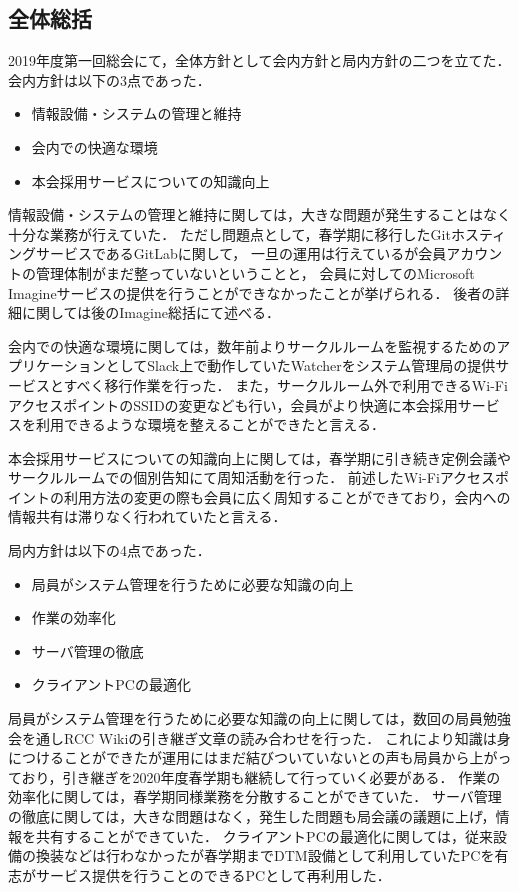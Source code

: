 \subsection*{全体総括}


2019年度第一回総会にて，全体方針として会内方針と局内方針の二つを立てた．会内方針は以下の3点であった．
\begin{itemize}
  \item 情報設備・システムの管理と維持
  \item 会内での快適な環境
  \item 本会採用サービスについての知識向上
\end{itemize}

情報設備・システムの管理と維持に関しては，大きな問題が発生することはなく十分な業務が行えていた．
ただし問題点として，春学期に移行したGitホスティングサービスであるGitLabに関して，
一旦の運用は行えているが会員アカウントの管理体制がまだ整っていないということと，
会員に対してのMicrosoft Imagineサービスの提供を行うことができなかったことが挙げられる．
後者の詳細に関しては後のImagine総括にて述べる．

会内での快適な環境に関しては，数年前よりサークルルームを監視するためのアプリケーションとしてSlack上で動作していたWatcherをシステム管理局の提供サービスとすべく移行作業を行った．
また，サークルルーム外で利用できるWi-FiアクセスポイントのSSIDの変更なども行い，会員がより快適に本会採用サービスを利用できるような環境を整えることができたと言える．

本会採用サービスについての知識向上に関しては，春学期に引き続き定例会議やサークルルームでの個別告知にて周知活動を行った．
前述したWi-Fiアクセスポイントの利用方法の変更の際も会員に広く周知することができており，会内への情報共有は滞りなく行われていたと言える．

局内方針は以下の4点であった．
\begin{itemize}
  \item 局員がシステム管理を行うために必要な知識の向上
  \item 作業の効率化
  \item サーバ管理の徹底
  \item クライアントPCの最適化
\end{itemize}

局員がシステム管理を行うために必要な知識の向上に関しては，数回の局員勉強会を通しRCC Wikiの引き継ぎ文章の読み合わせを行った．
これにより知識は身につけることができたが運用にはまだ結びついていないとの声も局員から上がっており，引き継ぎを2020年度春学期も継続して行っていく必要がある．
作業の効率化に関しては，春学期同様業務を分散することができていた．
サーバ管理の徹底に関しては，大きな問題はなく，発生した問題も局会議の議題に上げ，情報を共有することができていた．
クライアントPCの最適化に関しては，従来設備の換装などは行わなかったが春学期までDTM設備として利用していたPCを有志がサービス提供を行うことのできるPCとして再利用した．
